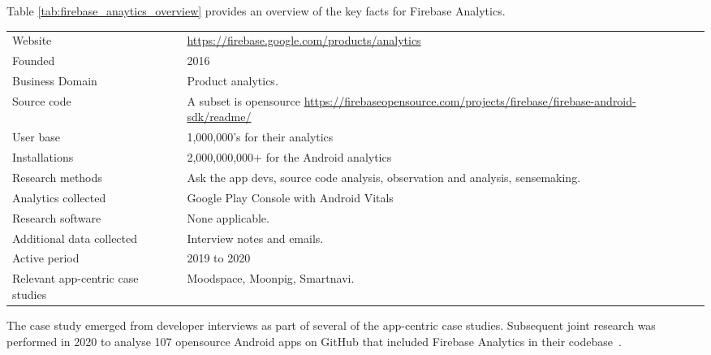 Table \ref{tab:firebase_anaytics_overview} provides an overview of the key facts for Firebase Analytics.

{\renewcommand{\arraystretch}{0.8}%
\begin{table*}
    \centering
    \small
    \setlength{\tabcolsep}{6pt}
    \begin{tabular}{lp{9cm}}
       \toprule
       Website &\url{https://firebase.google.com/products/analytics} \\
       Founded & 2016\\
       Business Domain & Product analytics. \\
       Source code  & A subset is opensource \url{https://firebaseopensource.com/projects/firebase/firebase-android-sdk/readme/} \\
       \midrule
       User base & 1,000,000's for their analytics \\
       Installations & 2,000,000,000+ for the Android analytics\footnotemark \\
       \midrule
       Research methods &Ask the app devs, source code analysis, observation and analysis, sensemaking. \\
       Analytics collected &Google Play Console with Android Vitals \\
       Research software & None applicable. \\
       Additional data collected &Interview notes and emails. \\
       Active period & 2019 to 2020 \\
       Relevant app-centric case studies & Moodspace, Moonpig, Smartnavi.\\
       \bottomrule
    \end{tabular}
    \caption{Tool Centric Case Study key facts: Firebase Analytics}
    \label{tab:firebase_anaytics_overview}
\end{table*}
}


The case study emerged from developer interviews as part of several of the app-centric case studies. Subsequent joint research was performed in 2020 to analyse 107 opensource Android apps on GitHub that included Firebase Analytics in their codebase~.

